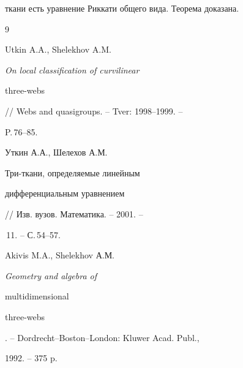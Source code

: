ткани есть уравнение Риккати общего вида. Теорема доказана. 


 


 


\begin{thebibliography}{9} 


 




Utkin A.A., Shelekhov A.M. {\em On local classification of curvilinear 


three-webs} // Webs and quasigroups. -- Tver: 1998--1999. -- 


P.\,76--85. 




Уткин А.А., Шелехов А.М. {Три-ткани, определяемые линейным 


дифференциальным уравнением} // Изв. вузов. Математика. -- 2001. -- 


\No\,11. -- С.\,54--57. 




Akivis M.A., Shelekhov А.М. {\em Geometry and algebra of 


multidimensional 


three-webs}. -- Dordrecht--Boston--London: Kluwer Acad. Publ., 


1992. -- 375 p. 


 


\end{thebibliography} 


 


\vskip 2cm 


 






\smallskip 






 


\label{end} 


 


